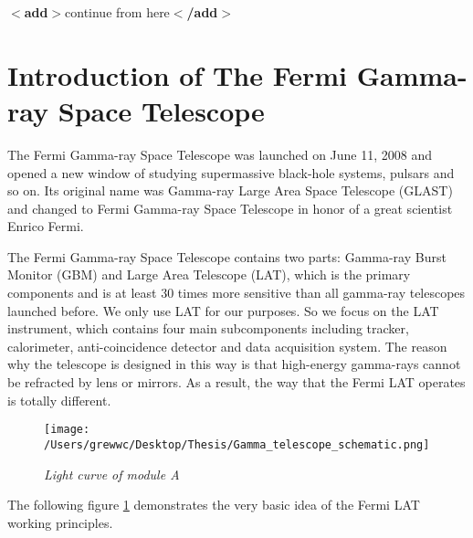 \documentclass[12pt]{report}
\newcommand{\mycaption}[1]{\caption{\textit{\footnotesize #1}}}
\newcommand{\add}[1]{
  $<$\textbf{add}$>$#1$<$\textbf{/add}$>$
}
\begin{document}
            
            


        
          \add{continue from here}

        \section{Introduction of The Fermi Gamma-ray Space Telescope}
          The Fermi Gamma-ray Space Telescope was launched on June 11, 2008 and opened a new window of studying
          supermassive black-hole systems, pulsars and so on. Its original name was Gamma-ray Large Area Space 
          Telescope (GLAST) and changed to Fermi Gamma-ray Space Telescope in honor of a great scientist 
          Enrico Fermi. 

          The Fermi Gamma-ray Space Telescope contains two parts: Gamma-ray Burst Monitor (GBM) and Large 
          Area Telescope (LAT), which is the primary components and is at least 30 times more sensitive than 
          all gamma-ray telescopes launched before. We only use LAT for our purposes. So we 
          focus on the LAT instrument, which contains four main subcomponents including tracker, calorimeter,
          anti-coincidence detector and data acquisition system. The reason why the telescope is designed in 
          this way is that high-energy gamma-rays cannot be refracted by lens or mirrors. As a result, the way
          that the Fermi LAT operates is totally different. 

        \begin{figure}[!ht]  
          \begin{minipage}{1\textwidth}
            \begin{center} 
                \texttt{[image: /Users/grewwc/Desktop/Thesis/Gamma\_telescope\_schematic.png]}
                \mycaption{Light curve of module A}
                \label{fig:fermi schematic}
            \end{center}
          \end{minipage}
        \end{figure}
        The following figure \ref{fig:fermi schematic} demonstrates the very basic idea of the Fermi LAT working
        principles. \\
\end{document}
